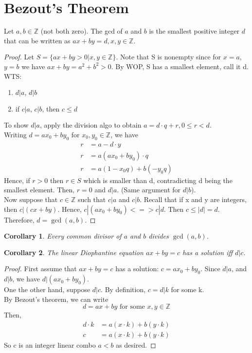 \documentclass[letterpaper]{article}
\newtheorem{corollary}{Corollary}[section]
\begin{document}
\section{Bezout's Theorem}
    Let $a,b\in\mathbb{Z}$ (not both zero). The gcd of $a$ and $b$ is the smallest
    positive integer $d$ that can be written as $ax+by=d, x,y\in\mathbb{Z}$.
    \begin{proof}
        Let $S = \{ax+by>0 | x,y\in\mathbb{Z}\}$. 
        Note that S is nonempty since for $x=a$, $y=b$ we have $ax+by= a^2+b^2>0$.
        By WOP, S has a smallest element, call it d. WTS:
        \begin{enumerate}
            \item $d|a$, $d|b$
            \item if $c|a$, $c|b$, then $c\leq d$
        \end{enumerate}
        To show $d|a$, apply the division algo to obtain $a=d\cdot q + r, 0\leq r<d$. \\
        Writing $d=ax_0 + by_0$ for $x_0,y_0\in\mathbb{Z}$, we have
        \begin{align*}
            r & = a-d\cdot y \\
            r & = a(ax_0 + by_0)\cdot q \\
            r & = a(1-x_0q) + b(-y_0q)
        \end{align*}
        Hence, if $r>0$ then $r\in S$ which is smaller than d, contradicting d being
        the smallest element. Then, $r=0$ and $d|a$. (Same argument for $d|b$). \\
        Now suppose that $c\in\mathbb{Z}$ such that $c|a$ and $c|b$. Recall that if x and y
        are integers, then $c|(cx+by)$. Hence, $c|(ax_0+by_0) <=> c|d$. 
        Then $c\leq |d| = d$.
        Therefore, $d=\gcd(a,b)$.
    \end{proof}
    \begin{corollary}
        Every common divisor of $a$ and $b$ divides $\gcd(a,b)$.
    \end{corollary}
    \begin{corollary}
        The linear Diophantine equation $ax+by=c$ has a solution iff $d|c$.
    \end{corollary}
    \begin{proof}
        First assume that $ax+by=c$ has a solution: $c=ax_0+by_0$. 
        Since $d|a$, and $d|b$, we have $d|(ax_0+by_0)$. \\
        One the other hand, suppose $d|c$. By definition, $c=d|k$ for some k. \\
        By Bezout's theorem, we can write 
        \[
            d=ax+by \text{ for some } x,y\in\mathbb{Z}
        \]
        Then,
        \begin{align*}
            d\cdot k & = a(x\cdot k) + b(y \cdot k) \\
            c & = a(x\cdot k)+b(y\cdot k)
        \end{align*}
        So c is an integer linear combo $a < b$ as desired.
    \end{proof}
\end{document}
